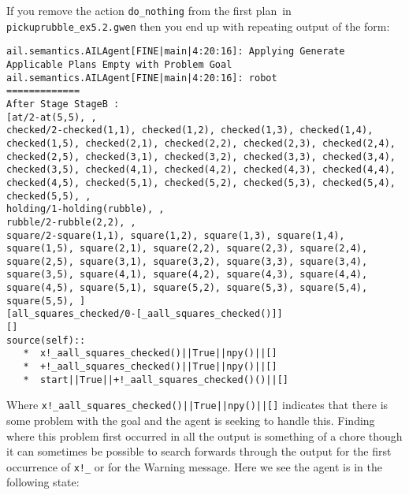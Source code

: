 \begin{sloppypar}
If you remove the action \texttt{do\_nothing} from the first plan\ in \texttt{pickuprubble\_ex5.2.gwen} then you end up with repeating output of the form:
\end{sloppypar}

\begin{verbatim}
ail.semantics.AILAgent[FINE|main|4:20:16]: Applying Generate Applicable Plans Empty with Problem Goal 
ail.semantics.AILAgent[FINE|main|4:20:16]: robot
=============
After Stage StageB :
[at/2-at(5,5), , 
checked/2-checked(1,1), checked(1,2), checked(1,3), checked(1,4), checked(1,5), checked(2,1), checked(2,2), checked(2,3), checked(2,4), checked(2,5), checked(3,1), checked(3,2), checked(3,3), checked(3,4), checked(3,5), checked(4,1), checked(4,2), checked(4,3), checked(4,4), checked(4,5), checked(5,1), checked(5,2), checked(5,3), checked(5,4), checked(5,5), , 
holding/1-holding(rubble), , 
rubble/2-rubble(2,2), , 
square/2-square(1,1), square(1,2), square(1,3), square(1,4), square(1,5), square(2,1), square(2,2), square(2,3), square(2,4), square(2,5), square(3,1), square(3,2), square(3,3), square(3,4), square(3,5), square(4,1), square(4,2), square(4,3), square(4,4), square(4,5), square(5,1), square(5,2), square(5,3), square(5,4), square(5,5), ]
[all_squares_checked/0-[_aall_squares_checked()]]
[]
source(self):: 
   *  x!_aall_squares_checked()||True||npy()||[]
   *  +!_aall_squares_checked()||True||npy()||[]
   *  start||True||+!_aall_squares_checked()()||[]
\end{verbatim}

\begin{sloppypar}
Where \texttt{x!\_aall\_squares\_checked()||True||npy()||[]} indicates that there is some problem with the goal and the agent is seeking to handle this.  Finding where this problem first occurred in all the output is something of a chore though it can sometimes be possible to search forwards through the output for the first occurrence of \texttt{x!\_}  or for the Warning message.  Here we see the agent is in the following state:
\end{sloppypar}

